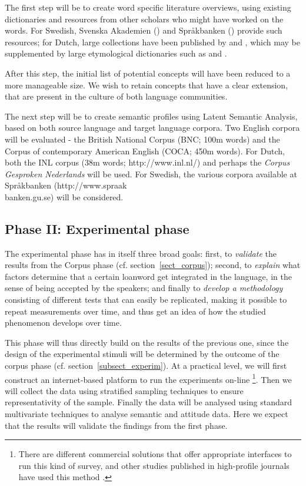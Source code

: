 \documentclass[a4paper]{article}
\begin{document}
The first step will be to create word specific literature overviews, using existing dictionaries and resources from other scholars who might have worked on the words. For Swedish, Svenska Akademien (\citet{Akademien2012}) and Spr\aa kbanken (\citet{Universitet2012}) provide such resources; for Dutch, large collections have been published by \cite{Koops2009} and \cite{Braamkolk2005}, which may be supplemented by large etymological dictionaries such as \citet{Sijs2001} and \citet{Sijs2005}.

After this step, the initial list of potential concepts will have been reduced to a more manageable size. We wish to retain concepts that have a clear extension, that are present in the culture of both language communities.

The next step will be to create semantic profiles using Latent Semantic Analysis, based on both source language and target language corpora. 
Two English corpora will be evaluated - the British National Corpus (BNC; 100m words) and the Corpus of contemporary American English (COCA; 450m words). 
For Dutch, both the INL corpus (38m words; http://www.inl.nl/) and perhaps the \textit{Corpus Gesproken Nederlands} \citep[Corpus of Spoken Dutch; 10m words][]{Oostdijk2003} will be used. 
For Swedish, the various corpora available at Spr\aa kbanken (http://www.spraak\\banken.gu.se) will be considered.


\subsection{Phase II: Experimental phase}

The experimental phase has in itself three broad goals:
first, to \emph{validate} the results from the Corpus phase (cf. section~\ref{sect_corpus});
second, to \emph{explain} what factors determine that a certain loanword get integrated in the language, in the sense of being accepted by the speakers;
and finally to \emph{develop a methodology} consisting of different tests that can easily be replicated, making it possible to repeat measurements over time, and thus get an idea of how the studied phenomenon develops over time.

This phase will thus directly build on the results of the previous one, since the design of the experimental stimuli will be determined by the outcome of the corpus phase (cf. section~\ref{subsect_experim}).
At a practical level, we will first construct an internet-based platform to run the experiments on-line%
\footnote{There are different commercial solutions that offer appropriate interfaces to run this kind of survey, and other studies published in high-profile journals have used this method \citep[e.g.][]{Scontras2012}.}.
Then we will collect the data using stratified sampling techniques to ensure representativity of the sample.
Finally the data will be analysed using standard multivariate techniques to analyse semantic and attitude data.
Here we expect that the results will validate the findings from the first phase.
\end{document}
